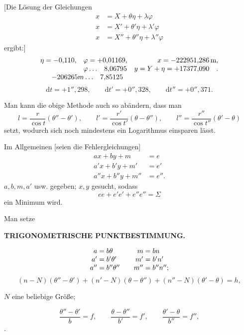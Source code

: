 [Die Lösung der Gleichungen
\[
\begin{aligned}
 x&=X+\theta\eta+\lambda\varphi\\
 x&=X'+\theta'\eta+\lambda'\varphi\\
 x&=X''+\theta''\eta+\lambda''\varphi
\end{aligned}
\]
\noindent ergibt:]
\[
\begin{array}{@{}r@{\quad}l@{\quad}r@{}}
 \eta=-0{,}110,&\varphi=+0{,}01169,&x=-222951{,}286\,\mathrm{m},\\
 &\varphi\,.\,.\,.\quad 8{,}06795&y=Y+\eta=+17377{,}090\quad .\\
 \multicolumn{2}{c}{-206265m\,.\,.\,.\quad 7{,}85125}&
\end{array}
\]
\[
 \mathrm{d}t=+1''{,}298,\qquad
 \mathrm{d}t'=+0''{,}328,\qquad
 \mathrm{d}t''=+0''{,}371.
\]

Man kann die obige Methode auch so abändern, dass man
\[
 l=\frac{r}{\cos t}(\theta''-\theta'),\qquad
 l'=\frac{r'}{\cos t'}(\theta-\theta''),\qquad
 l''=\frac{r''}{\cos t''}(\theta'-\theta)
\]
\noindent setzt, wodurch sich noch mindestens ein Logarithmus einsparen lässt.

\bigskip
{\centering
[4.]\par{}\par}
Im Allgemeinen [seien die Fehlergleichungen]
\[
\begin{aligned}
 ax+by+m&=e\\
 a'x+b'y+m'&=e'\\
 a''x+b''y+m''&=e''.
\end{aligned}
\]
\noindent \(a,b,m,a'\) usw. gegeben; \(x,y\) gesucht, sodass
\[
 ee+e'e'+e''e''=\Sigma
\]
\noindent ein Minimum wird.

Man setze

\par\clearpage
\noindent\null\hfill{\small\textbf{TRIGONOMETRISCHE PUNKTBESTIMMUNG.}}\hfill{}\par\medskip

\[
\begin{array}{@{}r@{\;=\;}l@{\qquad}r@{\;=\;}l@{}}
 a&b\theta&m&bn\\
 a'&b'\theta'&m'&b'n'\\
 a''&b''\theta''&m''&b''n'';
\end{array}
\]
\[
 (n-N)(\theta''-\theta')+(n'-N)(\theta-\theta'')+
 (n''-N)(\theta'-\theta)=h,
\]
{\centering \(N\) eine beliebige Größe;\par}
\[
 \frac{\theta''-\theta'}{b}=f,\qquad
 \frac{\theta-\theta''}{b'}=f',\qquad
 \frac{\theta'-\theta}{b''}=f'',
\]
.
\]

